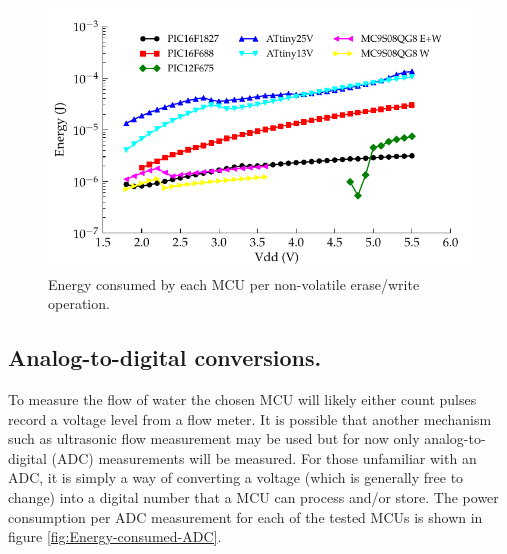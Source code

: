 \begin{figure}
\begin{centering}
\includegraphics{content/pt1/02-Microcontrollers/graphics/Graph_All_EEPROM_JPO}
\par\end{centering}

\protect\caption{Energy consumed by each MCU per non-volatile erase/write operation.\label{fig:Energy-consumed-EEPROM}}
\end{figure}



\subsection{Analog-to-digital conversions.}

To measure the flow of water the chosen MCU will likely either count
pulses record a voltage level from a flow meter. It is possible that
another mechanism such as ultrasonic flow measurement may be used
but for now only analog-to-digital (ADC) measurements will be measured.
For those unfamiliar with an ADC, it is simply a way of converting
a voltage (which is generally free to change) into a digital number
that a MCU can process and/or store. The power consumption per ADC
measurement for each of the tested MCUs is shown in figure \ref{fig:Energy-consumed-ADC}.

